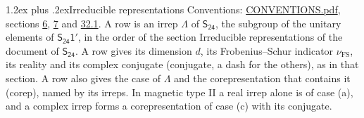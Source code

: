 \documentclass[10pt,a4paper]{article}
\makeatletter
\renewcommand\section{\@startsection{section}{1}{\z@}{-3ex plus -1ex minus -.2ex}%
  {1.2ex plus .2ex}{\normalfont\large\sffamily\bfseries\color{parttitle}}}
\numberwithin{equation}{section}
\newcommand{\grp}[1]{\mathsf{#1}}
\newcommand{\fsind}{\nu_{\mathrm{FS}}}
\makeatother
\begin{document}
\section{Irreducible representations}\label{s:irreps}
Conventions: \href{../../CONVENTIONS.pdf}{CONVENTIONS.pdf}, sections \href{../../../rotation/CONVENTIONS.pdf\#conv.6}{6}, \href{../../../rotation/CONVENTIONS.pdf\#conv.7}{7} and \href{../../CONVENTIONS.pdf\#conv.32.1}{32.1}.
\leavevmode\label{n:irrep.Delta}A row is an irrep $\Lambda$ of $\grp{S_{24}}$, the subgroup of the unitary elements of $\grp{S_{24}1'}$, in the order of the section Irreducible representations of the document of \href{../../../rotation/data/pdf/S24.pdf}{$\grp{S_{24}}$}. \label{n:index.dimension}\label{n:index.frobenius}\label{n:head.irrep}\label{n:head.reality}\label{n:head.conjugate}A row gives its dimension $d$, its Frobenius--Schur indicator $\fsind$, its reality and its complex conjugate (conjugate, a dash for the others), as in that section. \label{n:head.case.corep}\label{n:head.corep}A row also gives the case of $\Lambda$ and the corepresentation that contains it (corep), named by its irreps. In magnetic type II a real irrep alone is of case (a), and a complex irrep forms a corepresentation of case (c) with its conjugate.
\setlength{\emergencystretch}{2em}\par\setlength{\emergencystretch}{0pt}
\end{document}
